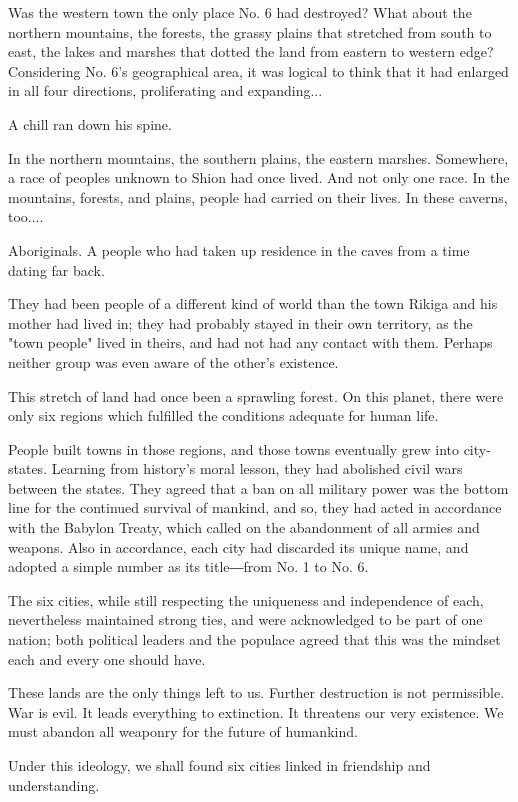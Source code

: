 Was the western town the only place No. 6 had destroyed? What about the
northern mountains, the forests, the grassy plains that stretched from
south to east, the lakes and marshes that dotted the land from eastern
to western edge? Considering No. 6's geographical area, it was logical
to think that it had enlarged in all four directions, proliferating and
expanding...

A chill ran down his spine.

In the northern mountains, the southern plains, the eastern marshes.
Somewhere, a race of peoples unknown to Shion had once lived. And not
only one race. In the mountains, forests, and plains, people had carried
on their lives. In these caverns, too....

Aboriginals. A people who had taken up residence in the caves from a
time dating far back.

They had been people of a different kind of world than the town Rikiga
and his mother had lived in; they had probably stayed in their own
territory, as the "town people" lived in theirs, and had not had any
contact with them. Perhaps neither group was even aware of the other's
existence.

This stretch of land had once been a sprawling forest. On this planet,
there were only six regions which fulfilled the conditions adequate for
human life.

People built towns in those regions, and those towns eventually grew
into city-states. Learning from history's moral lesson, they had
abolished civil wars between the states. They agreed that a ban on all
military power was the bottom line for the continued survival of
mankind, and so, they had acted in accordance with the Babylon Treaty,
which called on the abandonment of all armies and weapons. Also in
accordance, each city had discarded its unique name, and adopted a
simple number as its title―from No. 1 to No. 6.

The six cities, while still respecting the uniqueness and independence
of each, nevertheless maintained strong ties, and were acknowledged to
be part of one nation; both political leaders and the populace agreed
that this was the mindset each and every one should have.

These lands are the only things left to us. Further destruction is not
permissible. War is evil. It leads everything to extinction. It
threatens our very existence. We must abandon all weaponry for the
future of humankind.

Under this ideology, we shall found six cities linked in friendship and
understanding.

